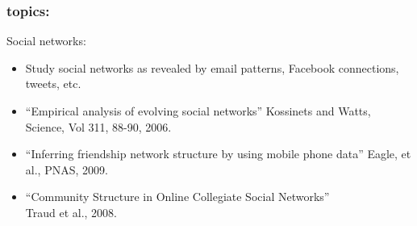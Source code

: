






\begin{frame}
  \frametitle{topics:}

  \begin{block}{Social networks:}
  \begin{itemize}
  \item
    Study social networks as revealed
    by email patterns, Facebook connections, tweets, etc.
  \item
    ``Empirical analysis of evolving social networks''
    Kossinets and Watts, Science, Vol 311, 88-90, 2006.\cite{kossinets2006a}
  \item
    ``Inferring friendship network structure by using mobile phone data''
    Eagle, et al., PNAS, 2009.
  \item
    ``Community Structure in Online Collegiate Social Networks''\\
    Traud et al., 2008.\\
  \end{itemize}
  \end{block}

\end{frame}


